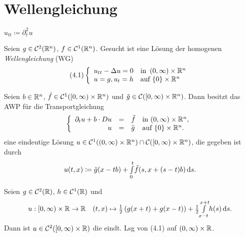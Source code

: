 \documentclass{cheat-sheet}
\begin{document}

\section{Wellengleichung}




\begin{nota}
  $u_{tt} \coloneqq \partial_t^2 u$
\end{nota}

\begin{prob}
  Seien $g \in \mathcal{C}^2(\mathbb{R}^n)$, $f \in \mathcal{C}^1(\mathbb{R}^n)$. Gesucht ist eine Lösung der homogenen \emph{Wellengleichung} (WG)
  \[
    (4.1) \left\{ \begin{array}{ll}
      u_{tt} - \Delta u = 0 & \text{in } \left( 0, \infty \right) \times \mathbb{R}^n\\
      u = g, u_t = h & \text{auf } \{ 0 \} \times \mathbb{R}^n
    \end{array} \right.
  \]
\end{prob}

\begin{satz}
  Seien $b \in \mathbb{R}^n$, $\tilde{f} \in \mathcal{C}^1(\left[ 0, \infty \right) \times \mathbb{R}^n)$ und $\tilde{g} \in \mathcal{C}(\left[ 0, \infty \right) \times \mathbb{R}^n)$. Dann besitzt das AWP für die Transportgleichung
  \[
    \left\{ \begin{array}{rlll}
      \partial_t u + b \cdot Du &=& \tilde{f} & \text{in $\left( 0, \infty \right) \times \mathbb{R}^n$},\\
      u &=& \tilde{g} & \text{auf $\{ 0 \} \times \mathbb{R}^n$}.
    \end{array} \right.
  \]
  eine eindeutige Lösung $u \in \mathcal{C}^1(\left( 0, \infty \right) \times \mathbb{R}^n) \cap \mathcal{C}(\left[ 0, \infty \right) \times \mathbb{R}^n)$, die gegeben ist durch
  \[ u(t, x) \coloneqq \tilde{g}(x - tb) + {\textstyle \int\limits_{0}^{t}} \tilde{f}(s, x + (s - t) b) \,\mathrm{d} s. \]
\end{satz}

\begin{satz}
  Seien $g \in \mathcal{C}^2(\mathbb{R})$, $h \in \mathcal{C}^1(\mathbb{R})$ und
  \[
    u : \left[ 0, \infty \right) \times \mathbb{R} \to \mathbb{R} \quad
    (t, x) \mapsto \tfrac{1}{2} \left( g(x+t) + g(x-t) \right) + \tfrac{1}{2} {\textstyle \int\limits_{x-t}^{x+t}} h(s) \,\mathrm{d} s.
  \]
  Dann ist $u \in \mathcal{C}^2(\left[ 0, \infty \right) \times \mathbb{R})$ die eindt. Lsg von (4.1) auf $\left( 0, \infty \right) \times \mathbb{R}$.
\end{satz}
\end{document}
